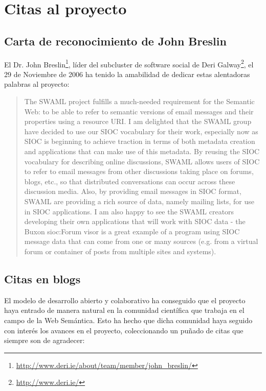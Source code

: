 
\chapter{Citas al proyecto}

\section{Carta de reconocimiento de John Breslin}

El Dr. John Breslin\footnote{\url{http://www.deri.ie/about/team/member/john_breslin/}},
líder del subcluster de software social de Deri Galway\footnote{\url{http://www.deri.ie/}},
el 29 de Noviembre de 2006 ha tenido la amabilidad de dedicar estas alentadoras palabras 
al proyecto:

\begin{quote}
 The SWAML project fulfills a much-needed requirement for the Semantic 
 Web: to be able to refer to semantic versions of email messages and 
 their properties using a resource URI.  I am delighted that the SWAML 
 group have decided to use our SIOC vocabulary for their work, especially 
 now as SIOC is beginning to achieve traction in terms of both metadata 
 creation and applications that can make use of this metadata.  By 
 reusing the SIOC vocabulary for describing online discussions, SWAML 
 allows users of SIOC to refer to email messages from other discussions 
 taking place on forums, blogs, etc., so that distributed conversations 
 can occur across these discussion media.  Also, by providing email 
 messages in SIOC format, SWAML are providing a rich source of data, 
 namely mailing lists, for use in SIOC applications.  I am also happy to 
 see the SWAML creators developing their own applications that will work 
 with SIOC data - the Buxon sioc:Forum visor is a great example of a 
 program using SIOC message data that can come from one or many sources 
 (e.g. from a virtual forum or container of posts from multiple sites 
 and systems).
\end{quote}

\newpage

\section{Citas en blogs}

El modelo de desarrollo abierto y colaborativo ha conseguido que el proyecto haya 
entrado de manera natural en la comunidad científica que trabaja en el campo de la
Web Semántica. Esto ha hecho que dicha comunidad haya seguido con interés los avances 
en el proyecto, coleccionando un puñado de citas que siempre son de agradecer:

